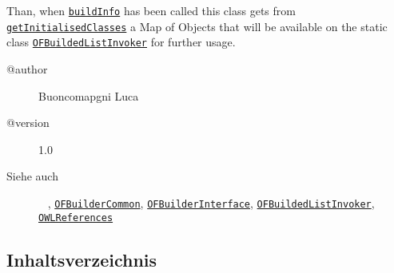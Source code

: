  Than, when \texttt{\hyperlink{ontologyFramework.OFRunning.OFInitialising.OFBuilderInterface.buildInfo(java.lang.String[],ontologyFramework.OFContextManagement.OWLReferences,ontologyFramework.OFRunning.OFInvokingManager.OFBuildedListInvoker)}{buildInfo}}
 has been called this class gets from \texttt{\hyperlink{ontologyFramework.OFRunning.OFInitialising.OFBuilderInterface.getInitialisedClasses()}{getInitialisedClasses}} a Map of
 Objects that will be available on the static class \texttt{\hyperlink{ontologyFramework.OFRunning.OFInvokingManager.OFBuildedListInvoker-class}{OFBuildedListInvoker}} for further usage.
 
 \par 
\begin{description}
\item[@author] 
Buoncomapgni Luca
\item[@version] 
1.0
\item[Siehe auch] ~
\noprint, \texttt{\hyperlink{ontologyFramework.OFRunning.OFInitialising.OFBuilderCommon-class}{OFBuilderCommon}}, \texttt{\hyperlink{ontologyFramework.OFRunning.OFInitialising.OFBuilderInterface<T>-class}{OFBuilderInterface}}, \texttt{\hyperlink{ontologyFramework.OFRunning.OFInvokingManager.OFBuildedListInvoker-class}{OFBuildedListInvoker}}, \texttt{\hyperlink{ontologyFramework.OFContextManagement.OWLReferences-class}{OWLReferences}}\end{description}
\subsection{Inhaltsverzeichnis}
